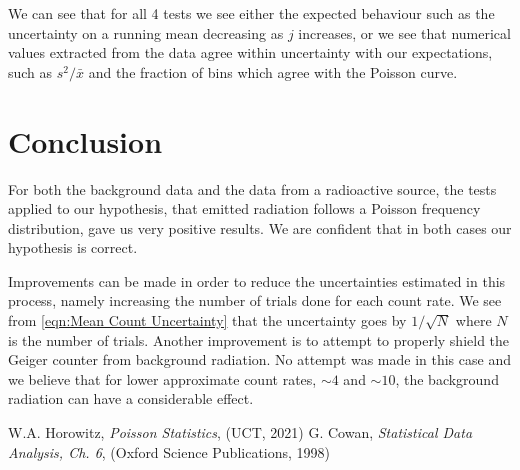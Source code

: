 \documentclass[12pt]{article}
\numberwithin{equation}{section}
\numberwithin{figure}{section}
\numberwithin{table}{section}
\begin{document}
\par We can see that for all 4 tests we see either the expected behaviour such as the uncertainty on a running mean decreasing as $j$ increases, or we see that numerical values extracted from the data agree within uncertainty with our expectations, such as $s^2/\bar{x}$ and the fraction of bins which agree with the Poisson curve. 

\section{Conclusion}\label{sec:Conclusion}
\par For both the background data and the data from a radioactive source, the tests applied to our hypothesis, that emitted radiation follows a Poisson frequency distribution, gave us very positive results. We are confident that in both cases our hypothesis is correct. 
\par Improvements can be made in order to reduce the uncertainties estimated in this process, namely increasing the number of trials done for each count rate. We see from \autoref{eqn:Mean Count Uncertainty} that the uncertainty goes by $1/\sqrt{N}$ where $N$ is the number of trials. Another improvement is to attempt to properly shield the Geiger counter from background radiation. No attempt was made in this case and we believe that for lower approximate count rates, $\sim 4$ and $\sim 10$, the background radiation can have a considerable effect. 

\newpage
\appendix




\begin{thebibliography}{9}
    W.A. Horowitz, \textit{Poisson Statistics}, (UCT, 2021)
    G. Cowan, \textit{Statistical Data Analysis, Ch. 6}, (Oxford Science Publications, 1998)

\end{thebibliography}
\end{document}

